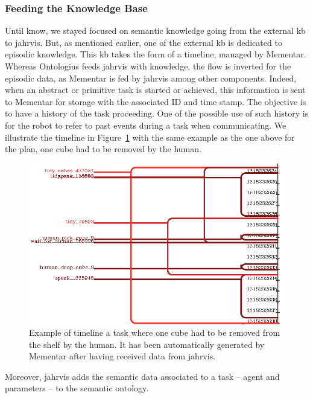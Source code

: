 \documentclass[a4paper,11pt,twoside]{StyleThese}
\begin{document}
\subsubsection{Feeding the Knowledge Base}\label{chap2:subsec:feeding}
Until know, we stayed focused on semantic knowledge going from the external \acrshort{kb} to \acrshort{jahrvis}. But, as mentioned earlier, one of the external \acrshort{kb} is dedicated to episodic knowledge. This \acrshort{kb} takes the form of a timeline, managed by Mementar. Whereas Ontologius feeds \acrshort{jahrvis} with knowledge, the flow is inverted for the episodic data, as Mementar is fed by \acrshort{jahrvis} among other components. Indeed, when an abstract or primitive task is started or achieved, this information is sent to Mementar for storage with the associated ID and time stamp. The objective is to have a history of the task proceeding. One of the possible use of such history is for the robot to refer to past events during a task when communicating. We illustrate the timeline in Figure~\ref{chap2:fig:timeline} with the same example as the one above for the plan, one cube had to be removed by the human.

\begin{figure}[!ht]
	\includegraphics[width=\linewidth]{figures/chapter2/timeline.png}
	\caption{Example of timeline a task where one cube had to be removed from the shelf by the human. It has been automatically generated by Mementar after having received data from \acrshort{jahrvis}.}
	\label{chap2:fig:timeline}
\end{figure}

Moreover, \acrshort{jahrvis} adds the semantic data associated to a task -- agent and parameters -- to the semantic ontology.
\end{document}
